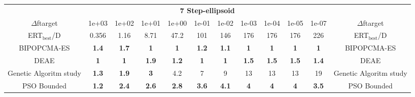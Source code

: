 \begin{tabular}{cccccccccccc}
 & \multicolumn{10}{c}{{\normalsize \textbf{7 Step-ellipsoid}}}\\
$\Delta$ftarget& 1e+03& 1e+02& 1e+01& 1e+00& 1e-01& 1e-02& 1e-03& 1e-04& 1e-05& 1e-07 & $\Delta$ftarget \\
ERT$_{\textrm{best}}$/D& 0.356& 1.16& 8.71& 47.2& 101& 146& 176& 176& 176& 226 & ERT$_{\textrm{best}}$/D \\
\hline
BIPOPCMA-ES & \textbf{1.4} & \textbf{1.7} & \textbf{1} & \textbf{1} & \textbf{1.2} & \textbf{1.1} & \textbf{1} & \textbf{1} & \textbf{1} & \textbf{1} & BIPOPCMA-ES \cite{add_an_entry_for_BIPOPCMA-ES_in_bbob.bib}\\
DEAE & \textbf{1} & \textbf{1} & \textbf{1.9} & \textbf{1.2} & \textbf{1} & \textbf{1} & \textbf{1.5} & \textbf{1.5} & \textbf{1.5} & \textbf{1.4} & DEAE \cite{add_an_entry_for_DEAE_in_bbob.bib}\\
Genetic Algoritm study & \textbf{1.3} & \textbf{1.9} & \textbf{3} & 4.2 & 7 & 9 & 13 & 13 & 13 & 19 & Genetic Algoritm study \cite{add_an_entry_for_Genetic Algoritm study_in_bbob.bib}\\
PSO Bounded & \textbf{1.2} & \textbf{2.4} & \textbf{2.6} & \textbf{2.8} & \textbf{3.6} & \textbf{4.1} & \textbf{4} & \textbf{4} & \textbf{4} & \textbf{3.5} & PSO Bounded \cite{add_an_entry_for_PSO Bounded_in_bbob.bib}
\end{tabular}
